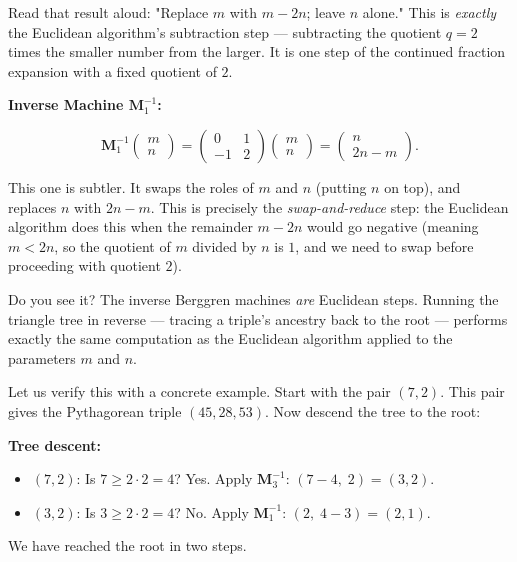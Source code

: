 Read that result aloud: "Replace $m$ with $m - 2n$; leave $n$ alone." This is \textit{exactly} the Euclidean algorithm's subtraction step --- subtracting the quotient $q = 2$ times the smaller number from the larger. It is one step of the continued fraction expansion with a fixed quotient of $2$.

\textbf{Inverse Machine $\mathbf{M}_1^{-1}$:}

\[
\mathbf{M}_1^{-1} \begin{pmatrix} m \\ n \end{pmatrix} = \begin{pmatrix} 0 & 1 \\ -1 & 2 \end{pmatrix} \begin{pmatrix} m \\ n \end{pmatrix} = \begin{pmatrix} n \\ 2n - m \end{pmatrix}.
\]

This one is subtler. It swaps the roles of $m$ and $n$ (putting $n$ on top), and replaces $n$ with $2n - m$. This is precisely the \textit{swap-and-reduce} step: the Euclidean algorithm does this when the remainder $m - 2n$ would go negative (meaning $m < 2n$, so the quotient of $m$ divided by $n$ is $1$, and we need to swap before proceeding with quotient $2$).

Do you see it? The inverse Berggren machines \textit{are} Euclidean steps. Running the triangle tree in reverse --- tracing a triple's ancestry back to the root --- performs exactly the same computation as the Euclidean algorithm applied to the parameters $m$ and $n$.

Let us verify this with a concrete example. Start with the pair $(7, 2)$. This pair gives the Pythagorean triple $(45, 28, 53)$. Now descend the tree to the root:

\textbf{Tree descent:}

\begin{itemize}[leftmargin=*]
\item $(7, 2)$: Is $7 \ge 2 \cdot 2 = 4$? Yes. Apply $\mathbf{M}_3^{-1}$: $(7 - 4,\; 2) = (3, 2)$.
\item $(3, 2)$: Is $3 \ge 2 \cdot 2 = 4$? No. Apply $\mathbf{M}_1^{-1}$: $(2,\; 4 - 3) = (2, 1)$.
\end{itemize}

We have reached the root in two steps.

